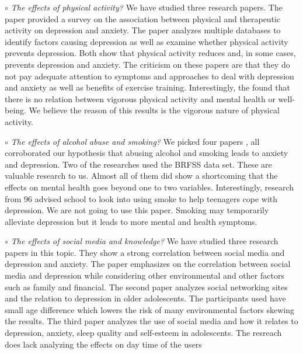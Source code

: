 \documentclass[letterpaper, 10 pt, conference]{ieeeconf}  %
\begin{document}
\par\noindent\textit{$\circ$ The effects of physical activity?}\newline
We have studied three research papers.  
The \cite{strohle2009physical} paper provided a survey on the association 
between physical and therapeutic activity on depression and anxiety. 
The \cite{mammen2013physical} paper analyzes multiple databases to identify factors causing depression as 
well as examine whether physical activity prevents depression. Both show that
physical activity reduces and, in some cases, prevents depression and anxiety. 
The criticism on these papers are that they do not pay adequate attention to symptoms 
and approaches to deal with depression and anxiety as well as benefits of exercise training.
Interestingly, the \cite{van2013exploratory} found that there is no 
relation between vigorous physical activity and mental health or well-being. We believe 
the reason of this results is the vigorous nature of physical activity. 

\setlength{\parskip}{1em} %

\par\noindent\textit{$\circ$ The effects of alcohol abuse and smoking?}\newline
We picked four papers \cite{jia2018associations}\cite{strine2008depression}\cite{allan2015effects}\cite{patton1996smoking}
, all corroborated our hypothesis that abusing alcohol and smoking leads to anxiety and depression. Two of the 
researches used the BRFSS data set. These are valuable research to us. Almost all of them did show a shortcoming that 
the effects on mental health goes beyond one to two variables. Interestingly, research \cite{patton1996smoking}  
from 96 advised school to look into using smoke to help teenagers cope with depression. We are not going to use this paper. 
Smoking may temporarily alleviate depression but it leads to more mental and health symptoms. 


\par\noindent\textit{$\circ$ The effects of social media and knowledge?}\newline
We have studied three research papers in this topic. They show a strong correlation between 
social media and depression and anxiety. The paper \cite{lin2016association} emphasizes on the correlation 
between social media and depression while considering other environmental and other factors such as family and financial. 
The second paper \cite{jelenchick2013facebook} analyzes social networking sites and the relation to depression in older 
adolescents. The participants used have small age difference which lowers the risk of many 
environmental factors skewing the results. The third paper \cite{woods2016sleepyteens} analyzes the use of social media 
and how it relates to depression, anxiety, sleep quality and self-esteem in adolescents. The resreach does 
lack analyzing the effects on day time of the users 
\end{document}
